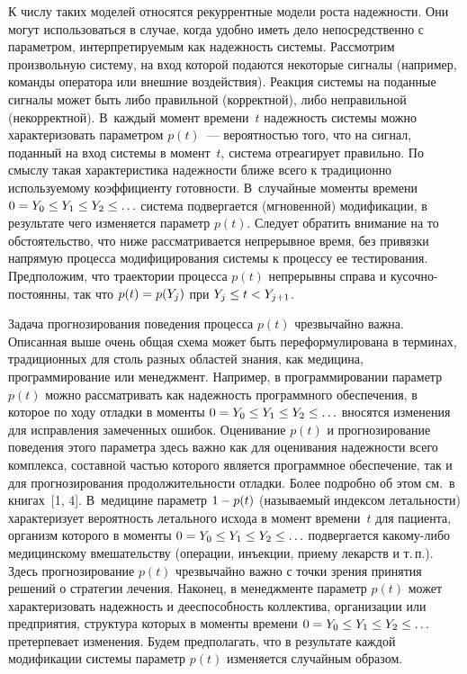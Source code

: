 \begin{multicols}{2}
К числу таких моделей относятся рекуррентные модели роста
надежности. Они могут использоваться в случае, когда удобно иметь
дело непосредственно с параметром, интерпретируемым как надежность
системы. Рассмотрим произвольную систему, на вход которой подаются
некоторые сигналы (например, команды оператора или внешние
воздействия). Реакция системы на поданные сигналы может быть либо
правильной (корректной), либо неправильной (некорректной). В~каждый
момент времени~$t$ надежность системы можно характеризовать
параметром $p(t)$~--- вероятностью того, что на сигнал, поданный на
вход системы в момент~$t$, система отреагирует правильно. По смыслу
такая характеристика надежности ближе всего к традиционно
используемому коэффициенту готовности. В~случайные моменты времени
$0\hm=Y_0\hm\le Y_1 \hm\le Y_2 \le\ldots$ система подвергается (мгновенной)
модификации, в результате чего изменяется параметр $p(t)$. Следует
обратить внимание на то обстоятельство, что ниже рассматривается
непрерывное время, без привязки напрямую процесса модифицирования
системы к процессу ее тестирования. Предположим, что траектории
процесса $p(t)$ непрерывны справа и кусочно-постоянны, так что $p(t)
\hm= p(Y_j)$ при $Y_j \hm\le t\hm< Y_{j+1}$.

Задача прогнозирования поведения процесса $p(t)$ чрезвычайно важна.
Описанная выше очень общая схема может быть переформулирована в
терминах, традиционных для столь разных областей знания, как
медицина, программирование или менеджмент. Например, в
программировании параметр $p(t)$ можно рассматривать как надежность
программного  обеспечения, в которое по ходу отладки в моменты
$0\hm=Y_0\hm\le Y_1\hm \le Y_2 \le\ldots$ вносятся изменения для исправления
замеченных ошибок. Оценивание $p(t)$ и прогнозирование поведения
этого параметра здесь важно как для оценивания надежности всего
комплекса, составной частью которого является программное
обеспечение, так и для прогнозирования продолжительности отладки.
Более подробно об этом см.\ в книгах~[1, 4]. В~медицине параметр
$1\hm - p(t)$ (называемый индексом ле\-таль\-ности) характеризует
вероятность летального исхода в момент времени~$t$ для пациента,
организм которого в моменты $0\hm=Y_0\hm\le Y_1 \hm\le Y_2 \le\ldots$
подвергается какому-либо медицинскому вмешательству (операции,
инъекции, приему лекарств и т.\,п.). Здесь прогнозирование $p(t)$
чрезвычайно важно с точки зрения принятия решений о стратегии
лечения. Наконец, в менеджменте параметр $p(t)$ может
характеризовать надежность и дееспособность коллектива, организации
или предприятия, структура которых в моменты времени $0\hm=Y_0\hm\le Y_1
\hm\le Y_2 \le\ldots$ претерпевает изменения. Будем предполагать, что в
результате каждой модификации системы параметр $p(t)$ изменяется
случайным  образом.


\end{multicols}
